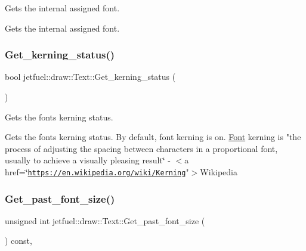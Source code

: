 Gets the internal assigned font. 

Gets the internal assigned font. \mbox{\label{classjetfuel_1_1draw_1_1Text_a35deab301fc970a0f23e490156720776}} 
\subsubsection{\texorpdfstring{Get\+\_\+kerning\+\_\+status()}{Get\_kerning\_status()}}
{\footnotesize\ttfamily bool jetfuel\+::draw\+::\+Text\+::\+Get\+\_\+kerning\+\_\+status (\begin{DoxyParamCaption}{ }\end{DoxyParamCaption})\hspace{0.3cm}{\ttfamily [inline]}}



Gets the font\textquotesingle{}s kerning status. 

Gets the font\textquotesingle{}s kerning status. By default, font kerning is on. \hyperlink{classjetfuel_1_1draw_1_1Font}{Font} kerning is "the process of adjusting the spacing between characters in a proportional font, usually to achieve a visually pleasing result\char`\"{}
-\/ $<$a href=\char`\"{}\href{https://en.wikipedia.org/wiki/Kerning}{\tt https\+://en.\+wikipedia.\+org/wiki/\+Kerning}"$>$Wikipedia \mbox{\label{classjetfuel_1_1draw_1_1Text_ab24383675fab628744a31d8d95934d6f}} 
\subsubsection{\texorpdfstring{Get\+\_\+past\+\_\+font\+\_\+size()}{Get\_past\_font\_size()}}
{\footnotesize\ttfamily unsigned int jetfuel\+::draw\+::\+Text\+::\+Get\+\_\+past\+\_\+font\+\_\+size (\begin{DoxyParamCaption}{ }\end{DoxyParamCaption}) const\hspace{0.3cm}{\ttfamily [inline]}, {\ttfamily [protected]}}



